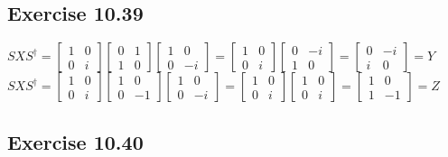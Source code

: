 \documentclass[a4paper,12pt]{article}
\begin{document}
\subsection*{Exercise 10.39}
$SXS^\dagger=
\begin{bmatrix}
    1&0\\
    0&i
\end{bmatrix}
\begin{bmatrix}
    0&1\\
    1&0
\end{bmatrix}
\begin{bmatrix}
    1&0\\
    0&-i
\end{bmatrix}=
\begin{bmatrix}
    1&0\\
    0&i
\end{bmatrix}
\begin{bmatrix}
    0&-i\\
    1&0
\end{bmatrix}=
\begin{bmatrix}
    0&-i\\
    i&0
\end{bmatrix}=Y$\\
$SXS^\dagger=
\begin{bmatrix}
    1&0\\
    0&i
\end{bmatrix}
\begin{bmatrix}
    1&0\\
    0&-1
\end{bmatrix}
\begin{bmatrix}
    1&0\\
    0&-i
\end{bmatrix}=
\begin{bmatrix}
    1&0\\
    0&i
\end{bmatrix}
\begin{bmatrix}
    1&0\\
    0&i
\end{bmatrix}=
\begin{bmatrix}
    1&0\\
    1&-1
\end{bmatrix}=Z$
\subsection*{Exercise 10.40}
\end{document}
